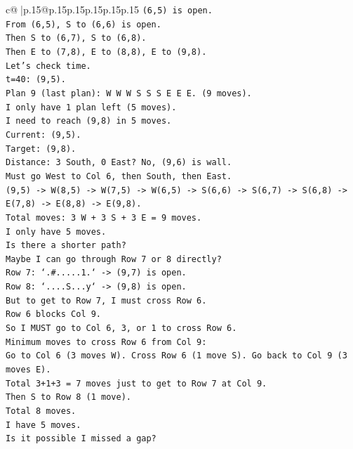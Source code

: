 \documentclass{article}
\begin{document}
{\begin{supertabular}{c@{$\;$}|p{.15\linewidth}@{}p{.15\linewidth}p{.15\linewidth}p{.15\linewidth}p{.15\linewidth}p{.15\linewidth}}
{{{\texttt{(6,5) is open.} \\
\texttt{From (6,5), S to (6,6) is open.} \\
\texttt{Then S to (6,7), S to (6,8).} \\
\texttt{Then E to (7,8), E to (8,8), E to (9,8).} \\
\texttt{Let's check time.} \\
\texttt{t=40: (9,5).} \\
\texttt{Plan 9 (last plan): W W W S S S E E E. (9 moves).} \\
\texttt{I only have 1 plan left (5 moves).} \\
\texttt{I need to reach (9,8) in 5 moves.} \\
\texttt{Current: (9,5).} \\
\texttt{Target: (9,8).} \\
\texttt{Distance: 3 South, 0 East? No, (9,6) is wall.} \\
\texttt{Must go West to Col 6, then South, then East.} \\
\texttt{(9,5) {-}> W(8,5) {-}> W(7,5) {-}> W(6,5) {-}> S(6,6) {-}> S(6,7) {-}> S(6,8) {-}> E(7,8) {-}> E(8,8) {-}> E(9,8).} \\
\texttt{Total moves: 3 W + 3 S + 3 E = 9 moves.} \\
\texttt{I only have 5 moves.} \\
\texttt{Is there a shorter path?} \\
\texttt{Maybe I can go through Row 7 or 8 directly?} \\
\texttt{Row 7: `.\#.....1.` {-}> (9,7) is open.} \\
\texttt{Row 8: `....S...y` {-}> (9,8) is open.} \\
\texttt{But to get to Row 7, I must cross Row 6.} \\
\texttt{Row 6 blocks Col 9.} \\
\texttt{So I MUST go to Col 6, 3, or 1 to cross Row 6.} \\
\texttt{Minimum moves to cross Row 6 from Col 9:} \\
\texttt{Go to Col 6 (3 moves W). Cross Row 6 (1 move S). Go back to Col 9 (3 moves E).} \\
\texttt{Total 3+1+3 = 7 moves just to get to Row 7 at Col 9.} \\
\texttt{Then S to Row 8 (1 move).} \\
\texttt{Total 8 moves.} \\
\texttt{I have 5 moves.} \\
\texttt{Is it possible I missed a gap?} \\
}}}
\end{supertabular}}
\end{document}
